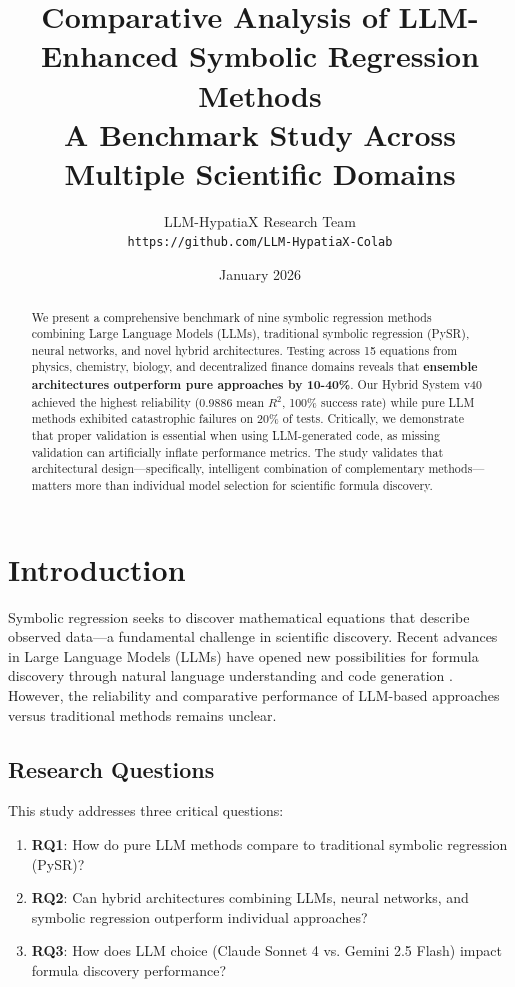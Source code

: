 \documentclass[11pt,a4paper]{article}
\title{\textbf{Comparative Analysis of LLM-Enhanced Symbolic Regression Methods}\\
\large A Benchmark Study Across Multiple Scientific Domains}
\author{
LLM-HypatiaX Research Team\\
\texttt{https://github.com/LLM-HypatiaX-Colab}
}
\date{January 2026}
\begin{document}
\maketitle

\begin{abstract}
We present a comprehensive benchmark of nine symbolic regression methods combining Large Language Models (LLMs), traditional symbolic regression (PySR), neural networks, and novel hybrid architectures. Testing across 15 equations from physics, chemistry, biology, and decentralized finance domains reveals that \textbf{ensemble architectures outperform pure approaches by 10-40\%}. Our Hybrid System v40 achieved the highest reliability (0.9886 mean $R^2$, 100\% success rate) while pure LLM methods exhibited catastrophic failures on 20\% of tests. Critically, we demonstrate that proper validation is essential when using LLM-generated code, as missing validation can artificially inflate performance metrics. The study validates that architectural design—specifically, intelligent combination of complementary methods—matters more than individual model selection for scientific formula discovery.
\end{abstract}

\section{Introduction}

Symbolic regression seeks to discover mathematical equations that describe observed data—a fundamental challenge in scientific discovery. Recent advances in Large Language Models (LLMs) have opened new possibilities for formula discovery through natural language understanding and code generation \cite{claude2024}. However, the reliability and comparative performance of LLM-based approaches versus traditional methods remains unclear.

\subsection{Research Questions}

This study addresses three critical questions:

\begin{enumerate}
    \item \textbf{RQ1}: How do pure LLM methods compare to traditional symbolic regression (PySR)?
    \item \textbf{RQ2}: Can hybrid architectures combining LLMs, neural networks, and symbolic regression outperform individual approaches?
    \item \textbf{RQ3}: How does LLM choice (Claude Sonnet 4 vs. Gemini 2.5 Flash) impact formula discovery performance?
\end{enumerate}
\end{document}

